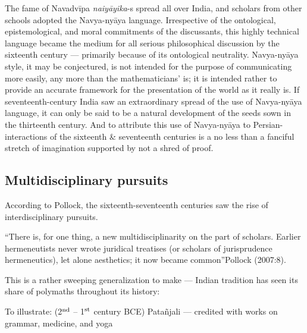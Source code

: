 The fame of Navadvīpa {\sl naiyāyika}-s spread all over India, and scholars from other schools adopted the Navya-nyāya language.  Irrespective of the ontological, epistemological, and moral commitments of the discussants, this highly technical language became the medium for all serious philosophical discussion by the sixteenth century — primarily because of its ontological neutrality. Navya-nyāya style, it may be conjectured, is not intended for the purpose of communicating more easily, any more than the mathematicians’ is; it is intended rather to provide an accurate framework for the presentation of the world as it really is. If seventeenth-century India saw an extraordinary spread of the use of Navya-nyāya language, it can only be said to be a natural development of the seeds sown in the thirteenth century. And to attribute this use of Navya-nyāya to Persian-interactions of the sixteenth \& seventeenth centuries is a no less than a fanciful stretch of imagination supported by not a shred of proof. 

\subsection{Multidisciplinary pursuits}%

According to Pollock, the sixteenth-seventeenth centuries saw the rise of interdisciplinary pursuits.

 “There is, for one thing, a new multidisciplinarity on the part of scholars. Earlier hermeneutists never wrote juridical treatises (or scholars of jurisprudence hermeneutics), let alone aesthetics; it now became common”\hfill Pollock (2007:8).

This is a rather sweeping generalization to make — Indian tradition has seen its share of polymaths throughout its history: 

To illustrate: (2$^{\rm nd}$ – 1$^{\rm st}$ century BCE) Patañjali  — credited with works on grammar, medicine, and yoga

